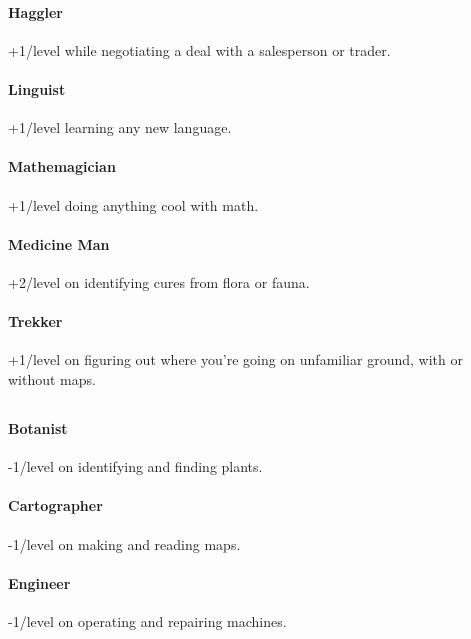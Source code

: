 \paragraph{Haggler}
\hypertarget{SkillHaggler}{}
+1/level while negotiating a deal with a salesperson or trader.

\paragraph{Linguist}
\hypertarget{SkillLinguist}{}
+1/level learning any new language.

\paragraph{Mathemagician}
\hypertarget{SkillMathemagician}{}
+1/level doing anything cool with math.

\paragraph{Medicine Man}
\hypertarget{SkillMedicineMan}{}
+2/level on identifying cures from flora or fauna.

\paragraph{Trekker}
\hypertarget{SkillTrekker}{}
+1/level on figuring out where you're going on unfamiliar ground, with or without maps.

\subsection{\lasersC}
\hypertarget{skillsLasers}{}

\paragraph{Botanist}
\hypertarget{SkillBotanist}{}
-1/level on identifying and finding plants.

\paragraph{Cartographer}
\hypertarget{SkillCartographer}{}
-1/level on making and reading maps.

\paragraph{Engineer}
\hypertarget{SkillEngineer}{}
-1/level on operating and repairing machines.

